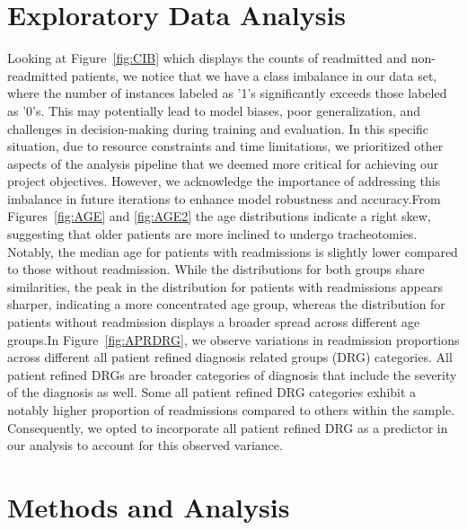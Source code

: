 \documentclass[sn-basic,pdflatex]{sn-jnl}
\theoremstyle{remark}
\theoremstyle{definition}
\begin{document}
\hypertarget{sec3}{%
\section{Exploratory Data Analysis}\label{sec3}}

Looking at Figure~\ref{fig:CIB} which displays the counts of readmitted
and non-readmitted patients, we notice that we have a class imbalance in
our data set, where the number of instances labeled as '1's
significantly exceeds those labeled as '0's. This may potentially lead
to model biases, poor generalization, and challenges in decision-making
during training and evaluation. \newline \newline In this specific
situation, due to resource constraints and time limitations, we
prioritized other aspects of the analysis pipeline that we deemed more
critical for achieving our project objectives. However, we acknowledge
the importance of addressing this imbalance in future iterations to
enhance model robustness and accuracy.\newline \newline From
Figures~\ref{fig:AGE} and \ref{fig:AGE2} the age distributions indicate
a right skew, suggesting that older patients are more inclined to
undergo tracheotomies. Notably, the median age for patients with
readmissions is slightly lower compared to those without readmission.
While the distributions for both groups share similarities, the peak in
the distribution for patients with readmissions appears sharper,
indicating a more concentrated age group, whereas the distribution for
patients without readmission displays a broader spread across different
age groups.\newline \newline In Figure~\ref{fig:APRDRG}, we observe
variations in readmission proportions across different all patient
refined diagnosis related groups (DRG) categories. All patient refined
DRGs are broader categories of diagnosis that include the severity of
the diagnosis as well. Some all patient refined DRG categories exhibit a
notably higher proportion of readmissions compared to others within the
sample. Consequently, we opted to incorporate all patient refined DRG as
a predictor in our analysis to account for this observed variance.

\hypertarget{sec4}{%
\section{Methods and Analysis}\label{sec4}}
\end{document}
